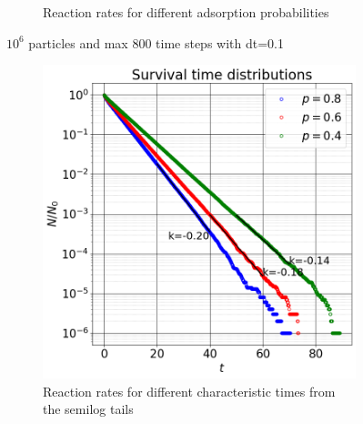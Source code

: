 \documentclass{article}
\begin{document}
\begin{figure}[htbp]
\begin{subfigure}[b]{0.48\textwidth}
        \caption{Reaction rates for different adsorption probabilities}
    \end{subfigure}
    \caption{$10^6$ particles and max 800 time steps with dt=0.1}
    \label{fig:survTimeDistProb}
\end{figure}

\begin{figure}[htbp]
    \centering
    \begin{subfigure}[b]{0.48\textwidth}
        \centering
        \includegraphics[width=\textwidth]{images/survTimeDistSemilogProb.png}
        \caption{Reaction rates for different characteristic times from the semilog tails}
    \end{subfigure}
    \hfill
    \begin{subfigure}[b]{0.48\textwidth}
        \centering

\end{subfigure}
\end{figure}
\end{document}
